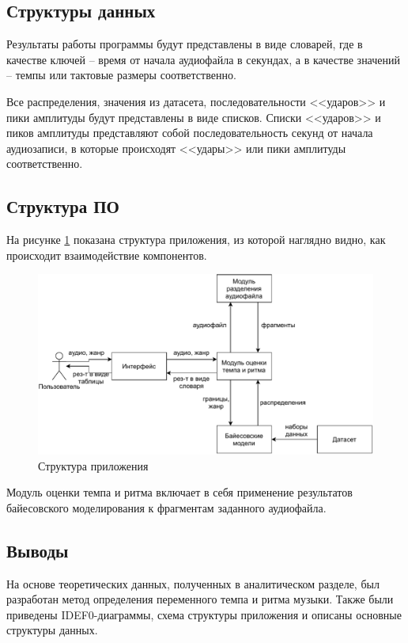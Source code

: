 \clearpage

\subsection{Структуры данных}

Результаты работы программы будут представлены в виде словарей, где в качестве ключей -- время от начала аудиофайла в секундах, а в качестве значений -- темпы или тактовые размеры соответственно.

Все распределения, значения из датасета, последовательности <<ударов>> и пики амплитуды будут представлены в виде списков. Списки <<ударов>> и пиков амплитуды представляют собой последовательность секунд от начала аудиозаписи, в которые происходят <<удары>> или пики амплитуды соответственно.

\subsection{Структура ПО}

На рисунке \ref{img:sw_structure} показана структура приложения, из которой наглядно видно, как происходит взаимодействие компонентов.

\begin{figure}[h]
	\centering
	\includegraphics[scale=0.9]{svg/sw_structure.pdf}
	\caption{Структура приложения}
	\label{img:sw_structure}
\end{figure}

Модуль оценки темпа и ритма включает в себя применение результатов байесовского моделирования к фрагментам заданного аудиофайла.

\newpage

\subsection*{Выводы}

На основе теоретических данных, полученных в аналитическом разделе, был разработан метод определения переменного темпа и ритма музыки. Также были приведены IDEF0-диаграммы, схема структуры приложения и описаны основные структуры данных.

